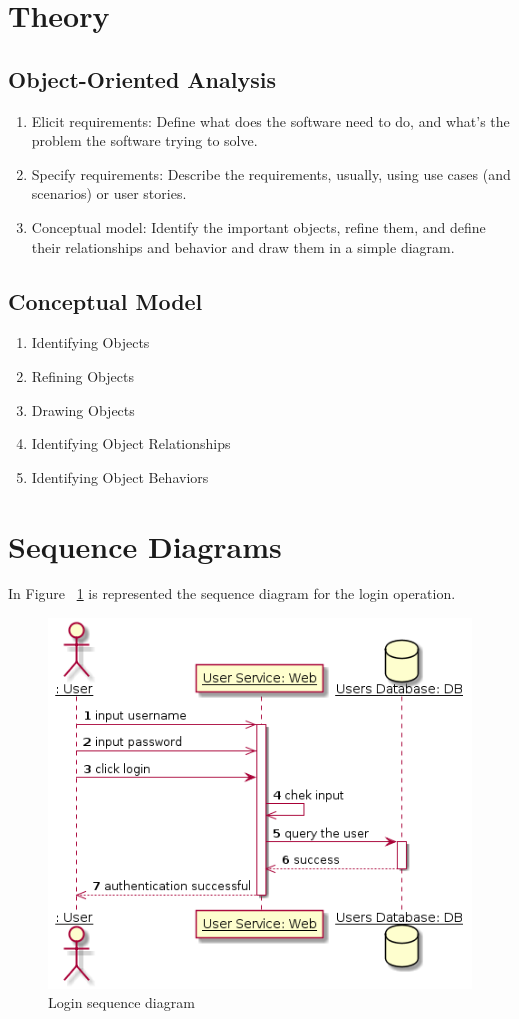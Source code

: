 \documentclass[12pt,a4paper,titlepage]{article}
\begin{document}
\section{Theory}

\subsection{Object-Oriented Analysis}
\begin{enumerate}  
	\item Elicit requirements: Define what does the software need to do, and what’s the problem the software trying to solve.
	\item Specify requirements: Describe the requirements, usually, using use cases (and scenarios) or user stories.
	\item Conceptual model: Identify the important objects, refine them, and define their relationships and behavior and draw them in a simple diagram.
\end{enumerate}


\subsection{Conceptual Model}
\begin{enumerate}  
	\item Identifying Objects
	\item Refining Objects
	\item Drawing Objects
	\item Identifying Object Relationships
	\item Identifying Object Behaviors
\end{enumerate}
\clearpage

\section{Sequence Diagrams}
In Figure ~\ref{fig:login} is represented the sequence diagram for the login operation.
\begin{figure}[H]
	\includegraphics[width=\textwidth]{login}
	\caption{Login sequence diagram}
	\centering
	\label{fig:login}
\end{figure}
\end{document}
